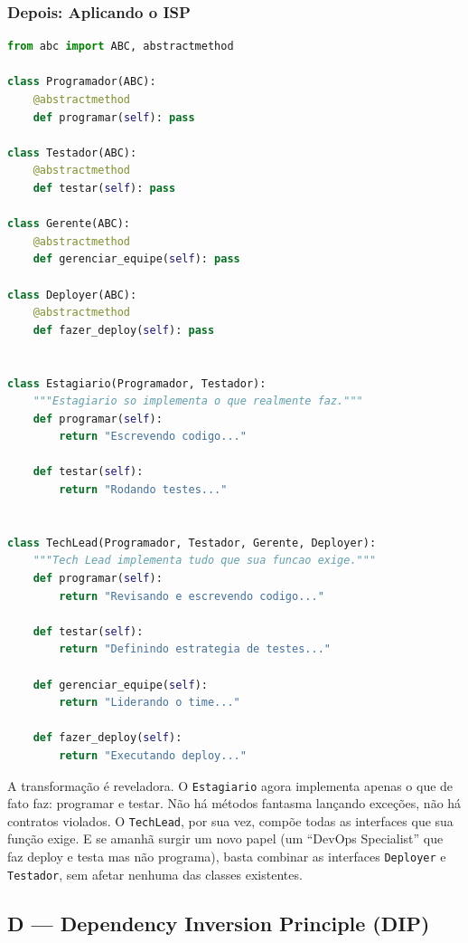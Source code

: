 \subsubsection{Depois: Aplicando o ISP}

\begin{lstlisting}[language=Python, caption={ISP aplicado: interfaces segregadas}]
from abc import ABC, abstractmethod

class Programador(ABC):
    @abstractmethod
    def programar(self): pass

class Testador(ABC):
    @abstractmethod
    def testar(self): pass

class Gerente(ABC):
    @abstractmethod
    def gerenciar_equipe(self): pass

class Deployer(ABC):
    @abstractmethod
    def fazer_deploy(self): pass


class Estagiario(Programador, Testador):
    """Estagiario so implementa o que realmente faz."""
    def programar(self):
        return "Escrevendo codigo..."

    def testar(self):
        return "Rodando testes..."


class TechLead(Programador, Testador, Gerente, Deployer):
    """Tech Lead implementa tudo que sua funcao exige."""
    def programar(self):
        return "Revisando e escrevendo codigo..."

    def testar(self):
        return "Definindo estrategia de testes..."

    def gerenciar_equipe(self):
        return "Liderando o time..."

    def fazer_deploy(self):
        return "Executando deploy..."
\end{lstlisting}

A transformação é reveladora. O \texttt{Estagiario} agora implementa apenas
o que de fato faz: programar e testar. Não há métodos fantasma lançando
exceções, não há contratos violados. O \texttt{TechLead}, por sua vez,
compõe todas as interfaces que sua função exige. E se amanhã surgir um novo
papel (um ``DevOps Specialist'' que faz deploy e testa mas não
programa), basta combinar as interfaces \texttt{Deployer} e
\texttt{Testador}, sem afetar nenhuma das classes existentes.


\subsection{D --- Dependency Inversion Principle (DIP)}

